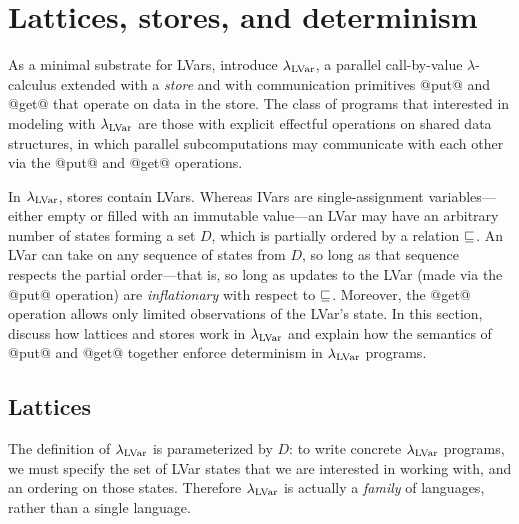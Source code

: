 \section{Lattices, stores, and determinism}\label{s:lvars-lattices}

As a minimal substrate for LVars,  introduce $\lambda_{\textrm{LVar}}$, a
parallel call-by-value $\lambda$-calculus extended with a \emph{store}
and with communication primitives @put@ and @get@ that operate on data
in the store.  The class of programs that  interested in modeling
with $\lambda_{\textrm{LVar}}$ are those with explicit effectful operations on
shared data structures, in which parallel subcomputations may
communicate with each other via the @put@ and @get@ operations.

In $\lambda_{\textrm{LVar}}$, stores contain LVars.  Whereas IVars are
single-assignment variables---either empty
or filled with an immutable value---an LVar may have an arbitrary
number of states forming a set $D$, which is partially ordered by a
relation $\sqsubseteq$.  An LVar can take on any sequence of states from
$D$, so long as that sequence respects the partial order---that is, so
long as updates to the LVar (made via the @put@ operation) are
\emph{inflationary} with respect to $\sqsubseteq$.  Moreover, the @get@
operation allows only limited observations of the LVar's state.  In
this section,  discuss how lattices and stores work in $\lambda_{\textrm{LVar}}$
and explain how the semantics of @put@ and @get@ together enforce
determinism in $\lambda_{\textrm{LVar}}$ programs.

\subsection{Lattices}\label{subsection:lvars-lattices}

The definition of $\lambda_{\textrm{LVar}}$ is parameterized by $D$: to write
concrete $\lambda_{\textrm{LVar}}$ programs, we must specify the set of LVar
states that we are interested in working with, and an ordering on
those states.  Therefore $\lambda_{\textrm{LVar}}$ is actually a \emph{family} of
languages, rather than a single language.

